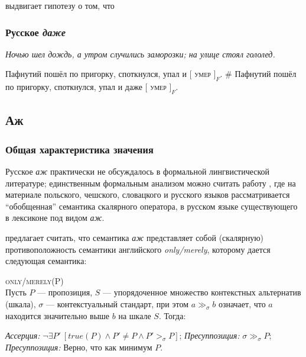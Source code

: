 \documentclass[a4paper, titlepage, 12pt]{article}
\begin{document}
\citep{wagner2015additivity} выдвигает гипотезу о том, что 

\medskip

\subsubsection{Русское \textit{даже}}

\begin{exe}
    \ex \textit{Ночью шел дождь, а утром случились заморозки; на улице стоял гололед.} \begin{xlist}
        \ex Пафнутий пошёл по пригорку, споткнулся, упал и $[$ \textsc{умер} $]_F$. 
        \ex \# Пафнутий пошёл по пригорку, споткнулся, упал и даже $[$ \textsc{умер} $]_F$.
    \end{xlist}
\end{exe}

\subsection{Аж} \label{azh}

\subsubsection{Общая характеристика значения}

Русское \textit{аж} практически не обсуждалось в формальной лингвистической литературе; единственным формальным анализом можно считать работу \citep{tomaszevicz2011az}, где на материале польского, чешского, словацкого и русского языков рассматривается ``обобщенная''  семантика скалярного оператора, в русском языке существующего в лексиконе под видом \textit{аж}.

\medskip

\citep{tomaszevicz2011az} предлагает считать, что семантика \textit{аж} представляет собой (скалярную) противоположность семантики английского \textit{only/merely}, которому дается следующая семантика:

\begin{exe}
    \ex \label{tomaszOnly} \textsc{only/merely(P)} \\ {\footnotesize Пусть $ P $ --- пропозиция, $ S $ --- упорядоченное множество контекстных альтернатив (шкала), $ \sigma $ --- контекстуальный стандарт, при  этом $ a \gg_{\sigma} b $ означает, что $ a $ находится значительно выше $ b $ на шкале $ S $. Тогда:} \begin{xlist}
        \ex \textit{Ассерция:} $ \lnot \exists P'\ [true(P) \land P' \neq P \land P' >_{\sigma} P] $;
        \ex \label{tomaszOnlySecond} \textit{Пресуппозиция:} $ \sigma \gg_{\sigma} P $;
        \ex \label{tomaszOnlyFirst} \textit{Пресуппозиция:} Верно, что как минимум $ P $.
    \end{xlist}
\end{exe}
\end{document}
